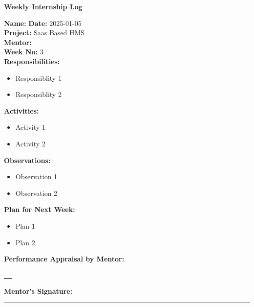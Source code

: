 \begin{center}
  \bfseries Weekly Internship Log
\end{center}

\noindent
\textbf{Name:}  \hfill \textbf{Date:} 2025-01-05 \\
\textbf{Project:} Saas Based HMS \hfill \\
\textbf{Mentor:}   \\
\textbf{Week No:} 3 \\

\noindent
\textbf{Responsibilities:}
\begin{itemize}
    \item Responsiblity 1
    \item Responsiblity 2
\end{itemize}

\noindent
\textbf{Activities:}
\begin{itemize}
    \item Activity 1
    \item Activity 2
\end{itemize}

\noindent
\textbf{Observations:}
\begin{itemize}
    \item Observation 1
    \item Observation 2
\end{itemize}

\noindent
\textbf{Plan for Next Week:}
\begin{itemize}
    \item  Plan 1
    \item Plan 2
\end{itemize}

\noindent
\textbf{Performance Appraisal by Mentor:} \\
\begin{table}[h]
    \centering
    \noindent
    \begin{tabularx}{\textwidth} { 
        | >{\centering\arraybackslash}X| }

        \hline
          \\ \\       	                    
        \hline
    \end{tabularx}
\end{table}


\vspace{2em}
\noindent
\textbf{Mentor’s Signature:} \\
\rule{0.4\textwidth}{0.5pt}
